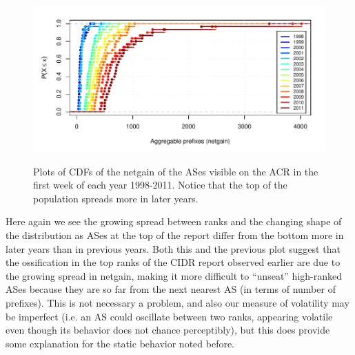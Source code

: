 \begin{figure}[h!]
\begin{centering}
\begin{singlespace}
    \includegraphics[width=6in]{figures/netgain_cdf_acr.pdf}
    \vspace{-2em}\\
    \caption{Plots of CDFs of the netgain of the ASes visible on the ACR in the
    first week of each year 1998-2011. Notice that the top of the population
    spreads more in later years.}
    \label{fig:netgain_cdf_acr}
\end{singlespace}
\end{centering}
\end{figure}

Here again we see the growing spread between ranks and the changing shape of
the distribution as ASes at the top of the report differ from the bottom more
in later years than in previous years. Both this and the previous plot suggest
that the ossification in the top ranks of the CIDR report observed earlier are
due to the growing spread in netgain, making it more difficult to ``unseat''
high-ranked ASes because they are so far from the next nearest AS (in terms of
number of prefixes). This is not necessary a problem, and also our measure of
volatility may be imperfect (i.e. an AS could oscillate between two ranks,
appearing volatile even though its behavior does not chance perceptibly), but
this does provide some explanation for the static behavior noted before.

%

